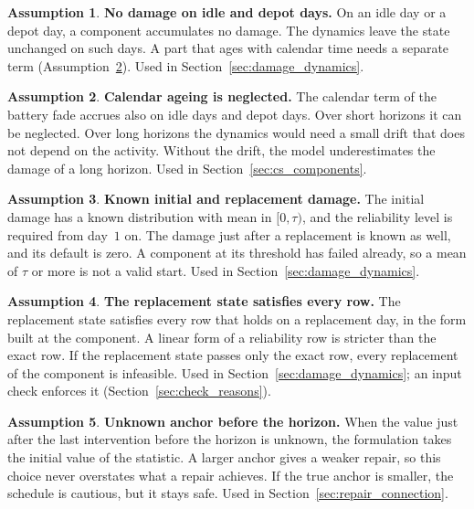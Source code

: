 \documentclass[11pt,a4paper]{article}
\theoremstyle{plain}
\theoremstyle{definition}
\newtheorem{assumption}{Assumption}
\theoremstyle{remark}
\begin{document}
\begin{assumption}\label{as:idle_days}
\textbf{No damage on idle and depot days.}
On an idle day or a depot day, a component accumulates no damage.
The dynamics leave the state unchanged on such days.
A part that ages with calendar time needs a separate term (Assumption~\ref{as:calendar}).
Used in Section~\ref{sec:damage_dynamics}.
\end{assumption}

\begin{assumption}\label{as:calendar}
\textbf{Calendar ageing is neglected.}
The calendar term of the battery fade accrues also on idle days and depot days.
Over short horizons it can be neglected.
Over long horizons the dynamics would need a small drift that does not depend on the activity.
Without the drift, the model underestimates the damage of a long horizon.
Used in Section~\ref{sec:cs_components}.
\end{assumption}

\begin{assumption}\label{as:initial_replacement}
\textbf{Known initial and replacement damage.}
The initial damage has a known distribution with mean in $[0,\tau)$, and the reliability level is required from day~$1$ on.
The damage just after a replacement is known as well, and its default is zero.
A component at its threshold has failed already, so a mean of $\tau$ or more is not a valid start.
Used in Section~\ref{sec:damage_dynamics}.
\end{assumption}

\begin{assumption}\label{as:replacement_state}
\textbf{The replacement state satisfies every row.}
The replacement state satisfies every row that holds on a replacement day, in the form built at the component.
A linear form of a reliability row is stricter than the exact row.
If the replacement state passes only the exact row, every replacement of the component is infeasible.
Used in Section~\ref{sec:damage_dynamics}; an input check enforces it (Section~\ref{sec:check_reasons}).
\end{assumption}

\begin{assumption}\label{as:unknown_anchor}
\textbf{Unknown anchor before the horizon.}
When the value just after the last intervention before the horizon is unknown, the formulation takes the initial value of the statistic.
A larger anchor gives a weaker repair, so this choice never overstates what a repair achieves.
If the true anchor is smaller, the schedule is cautious, but it stays safe.
Used in Section~\ref{sec:repair_connection}.
\end{assumption}
\end{document}
